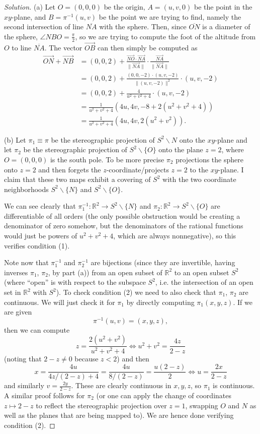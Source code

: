 \documentclass[10pt]{scrartcl}
\providecommand{\ol}{\overline}
\providecommand{\RR}{\mathbb R}
\providecommand{\setdiff}{\smallsetminus}
\providecommand{\inv}{^{-1}}
\newenvironment{soln}{\begin{proof}[Solution]}{\end{proof}}
\begin{document}
\begin{soln}
	(a) Let $O = (0,0,0)$ be the origin, $A = (u,v,0)$ be
	the point in the $xy$-plane, and $B = \pi\inv(u,v)$
	be the point we are trying to find, namely the second intersection of
	line $\ol{NA}$ with the sphere. Then, since $\ol{ON}$
	is a diameter of the sphere, $\angle NBO = \frac\pi2$,
	so we are trying to compute the foot of the altitude from
	$O$ to line $\ol{NA}$. The vector $\overrightarrow{OB}$ can then
	simply be computed as
	\begin{align*}
		\overrightarrow{ON} + \overrightarrow{NB}
		&= (0,0,2) +
		\frac{\overrightarrow{NO}\cdot\overrightarrow{NA}}
		{\|\overrightarrow{NA}\|}
		\cdot\frac{\overrightarrow{NA}}{\|\overrightarrow{NA}\|}\\
		&= (0,0,2) + \frac{(0,0,-2)\cdot(u,v,-2)}{\|(u,v,-2)\|^2}
		\cdot (u,v,-2)\\
		&= (0,0,2) + \frac{4}{u^2+v^2+4}\cdot (u,v,-2)\\
		&= \frac{1}{u^2+v^2+4}(4u,4v,-8+2(u^2+v^2+4))\\
		&= \frac{1}{u^2+v^2+4}(4u,4v,2(u^2+v^2)).
	\end{align*}
	
	(b) Let $\pi_1 \equiv \pi$ be the stereographic projection
	of $S^2\setdiff{N}$ onto the $xy$-plane and let
	$\pi_2$ be the stereographic projection of $S^2\setdiff\{O\}$
	onto the plane $z = 2$, where $O = (0,0,0)$ is the south pole.
	To be more precise $\pi_2$ projections the sphere onto $z=2$
	and then forgets the $z$-coordinate/projects $z=2$ to the $xy$-plane.
	I claim that these two maps exhibit a covering of $S^2$
	with the two coordinate neighborhoods $S^2\setdiff\{N\}$
	and $S^2\setdiff\{O\}$.
	
	We can see clearly that $\pi_1\inv\colon\RR^2\to S^2\setdiff\{N\}$
	and $\pi_2\colon\RR^2\to S^2\setdiff\{O\}$ are
	differentiable of all orders (the only possible obstruction
	would be creating a denominator of zero somehow, but the denominators
	of the rational functions would just be powers of $u^2+v^2+4$,
	which are always nonnegative), so this verifies condition (1).
	
	Note now that $\pi_1\inv$ and $\pi_2\inv$ are
	bijections (since they are invertible, having inverses $\pi_1$, $\pi_2$,
	by part (a)) from an open subset of $\RR^2$
	to an open subset $S^2$ (where ``open'' is with respect to
	the subspace $S^2$, i.e. the intersection of an open set
	in $\RR^2$ with $S^2$). To check condition (2) we need to also check
	that $\pi_1$, $\pi_2$ are continuous. We will just check it for $\pi_1$
	by directly computing $\pi_1(x,y,z)$. If we are given
	\[\pi\inv(u,v) = (x,y,z),\]
	then we can compute
	\[z = \frac{2(u^2+v^2)}{u^2+v^2 + 4}\iff
	u^2+v^2 = \frac{4z}{2-z}\]
	(noting that $2-z\ne 0$ because $z < 2$) and then
	\[x = \frac{4u}{4z/(2-z) + 4} = \frac{4u}{8/(2-z)} = \frac{u(2-z)}{2}
	\iff u = \frac{2x}{2 - z}\]
	and similarly $v = \frac{2y}{2-z}$. These are clearly continuous
	in $x,y,z$, so $\pi_1$ is continuous. A similar proof follows for $\pi_2$
	(or one can apply the change of coordinates $z\mapsto 2-z$
	to reflect the stereographic projection over $z=1$,
	swapping $O$ and $N$ as well as the planes that are being mapped to).
	We are hence done verifying condition (2).
	

\end{soln}
\end{document}
